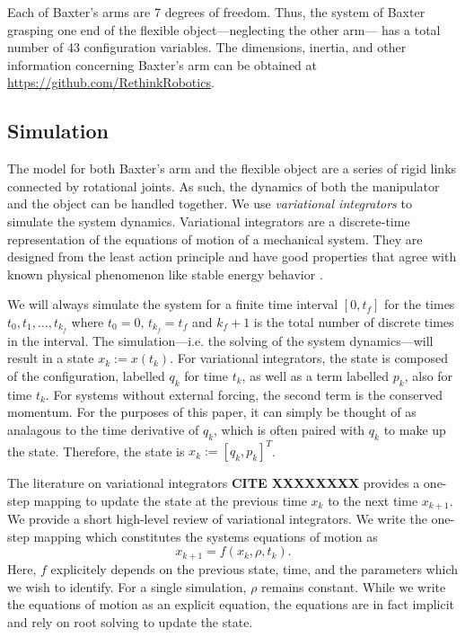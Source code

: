 \documentclass[runningheads,a4paper]{llncs}
\begin{document}
Each of Baxter's arms are 7 degrees of freedom. Thus, the system of Baxter grasping one end of the flexible object---neglecting the other arm--- has a total number of 43 configuration variables. The dimensions,  inertia, and other information concerning Baxter's arm can be obtained at \url{https://github.com/RethinkRobotics}.  

\subsection{Simulation}
The model for both Baxter's arm and the flexible object are a series of rigid links connected by rotational joints. As such, the dynamics of both the manipulator and the object can be handled together. We use \emph{variational integrators} to simulate the system dynamics.   Variational integrators are a discrete-time representation of the equations of motion of a mechanical system.  They are designed from the least action principle and have good properties that agree with known physical phenomenon like stable energy behavior \cite{pekarek_murphey}.  

We will always simulate the system for a finite time interval $[0,t_f]$ for the times $t_0,t_1,\ldots,t_{k_f}$ where $t_0 = 0$, $t_{k_f} = t_f$ and $k_f+1$ is the total number of discrete times in the interval. The simulation---i.e. the solving of the system dynamics---will result in a state $x_k:=x(t_k)$.  For variational integrators, the state is composed of the configuration, labelled $q_k$ for time $t_k$, as well as a term labelled $p_k$, also for time $t_k$. For systems without external forcing, the second term is the conserved momentum.  For the purposes of this paper, it can simply be thought of as analagous to the time derivative of $q_k$, which is often paired with $q_k$ to make up the state.  Therefore, the state is $x_k:=[q_k,p_k]^T$. 

The literature on variational integrators \textbf{CITE XXXXXXXX} provides a one-step mapping to update the state at the previous time $x_k$ to the next time $x_{k+1}$.  We provide a short high-level review of variational integrators.  We write the one-step mapping which constitutes the systems equations of motion as 
\begin{equation}
x_{k+1} = f(x_k,\rho,t_k).
\label{f_k}
\end{equation}
Here, $f$ explicitely depends on the previous state, time, and the parameters which we wish to identify. For a single simulation, $\rho$ remains constant.  While we write the equations of motion as an explicit equation, the equations are in fact implicit and rely on root solving to update the state. 
\end{document}
